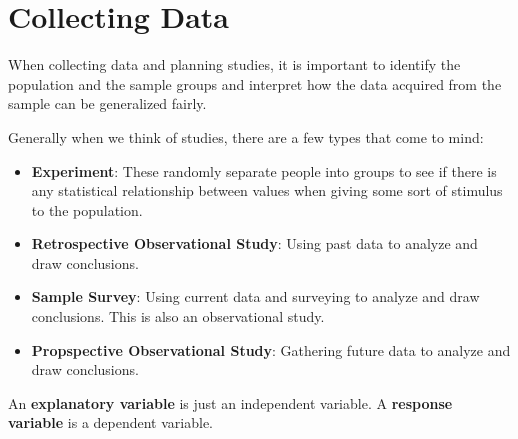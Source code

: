 \section{Collecting Data}

When collecting data and planning studies, it is important to identify the
population and the sample groups and interpret how the data acquired from the
sample can be generalized fairly.

Generally when we think of studies, there are a few types that come to mind:
\begin{itemize}
    \item \textbf{Experiment}: These randomly separate people into groups to
        see if there is any statistical relationship between values when giving
        some sort of stimulus to the population.
    \item \textbf{Retrospective Observational Study}: Using past data to analyze and draw conclusions.
    \item \textbf{Sample Survey}: Using current data and surveying to analyze and draw conclusions. This is also an observational study.
    \item \textbf{Propspective Observational Study}: Gathering future data to analyze and draw conclusions.
\end{itemize}

\begin{blackbox}
    \begin{definition}
        An \textbf{explanatory variable} is just an independent variable. A
        \textbf{response variable} is a dependent variable.
    \end{definition}
\end{blackbox}

